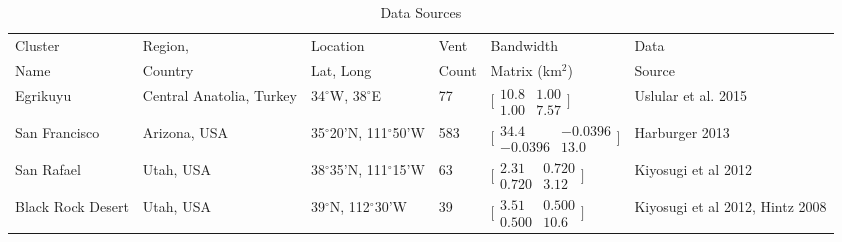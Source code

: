 \documentclass[12pt,letter]{article}
\begin{document}
\begin{table}
\centering
\caption{Data Sources}
\begin{tabular}{p{2cm} p{2.5cm} p{2cm} l l p{3.5cm}}
\toprule
Cluster	&	Region, &	Location	&	Vent &	Bandwidth	&	Data\\
Name		& Country	&	Lat, Long	&	Count	&	Matrix (km$^2$)	&Source\\
\midrule
Egrikuyu	&	Central Anatolia, Turkey	&	34$^{\circ}$W, 38$^{\circ}$E	&	77	&	$\bigl[\begin{smallmatrix} 10.8&1.00\\1.00&7.57 \end{smallmatrix}\bigr]$	&	Uslular et al. 2015\\
San Francisco	&	Arizona, USA	&	35$^{\circ}$20'N, 111$^{\circ}$50'W	&	583	&	$\bigl[\begin{smallmatrix} 34.4&-0.0396\\-0.0396&13.0 \end{smallmatrix}\bigr]$	&	Harburger 2013\\
San Rafael	&	Utah, USA	&	38$^{\circ}$35'N, 111$^{\circ}$15'W	&	63	&	$\bigl[\begin{smallmatrix} 2.31&0.720\\0.720&3.12 \end{smallmatrix}\bigr]$	&	Kiyosugi et al 2012\\
Black Rock Desert &	Utah, USA		&	39$^{\circ}$N, 112$^{\circ}$30'W&	39	&	$\bigl[\begin{smallmatrix} 3.51&0.500\\0.500&10.6 \end{smallmatrix}\bigr]$	&	Kiyosugi et al 2012, Hintz 2008\\

\end{tabular}
\end{table}
\end{document}
